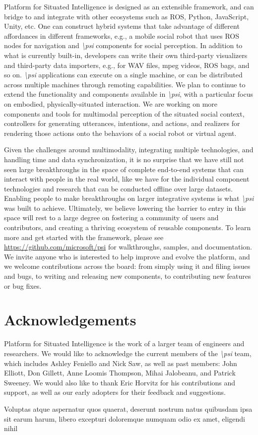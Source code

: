 \documentclass[letterpaper]{article}
\newcommand{\psif}{\emph{\textbackslash psi} }
\newcommand{\psifnospace}{\emph{\textbackslash psi}}
\begin{document}
Platform for Situated Intelligence is designed as an extensible framework, and can bridge to and integrate with other ecosystems such as ROS, Python, JavaScript, Unity, etc. One can construct hybrid systems that take advantage of different affordances in different frameworks, e.g., a mobile social robot that uses ROS nodes for navigation and \psif components for social perception. In addition to what is currently built-in, developers can write their own third-party visualizers and third-party data importers, e.g., for WAV files, mpeg videos, ROS bags, and so on. \psif applications can execute on a single machine, or can be distributed across multiple machines through remoting capabilities.  We plan to continue to extend the functionality and components available in \psifnospace, with a particular focus on embodied, physically-situated interaction. We are working on more components and tools for multimodal perception of the situated social context, controllers for generating utterances, intentions, and actions, and realizers for rendering those actions onto the behaviors of a social robot or virtual agent.

Given the challenges around multimodality, integrating multiple technologies, and handling time and data synchronization, it is no surprise that we have still not seen large breakthroughs in the space of complete end-to-end systems that can interact with people in the real world, like we have for the individual component technologies and research that can be conducted offline over large datasets. Enabling people to make breakthroughs on larger integrative systems is what \psif was built to achieve. Ultimately, we believe lowering the barrier to entry in this space will rest to a large degree on fostering a community of users and contributors, and creating a thriving ecosystem of reusable components.  To learn more and get started with the framework, please see \textcolor{blue}{\url{https://github.com/microsoft/psi}} for walkthroughs, samples, and documentation. We invite anyone who is interested to help improve and evolve the platform, and we welcome contributions across the board: from simply using it and filing issues and bugs, to writing and releasing new components, to contributing new features or bug fixes.

\vspace{-4.29mm}
\section{Acknowledgements}
Platform for Situated Intelligence is the work of a larger team of engineers and researchers. We would like to acknowledge the current members of the \psif team, which includes Ashley Feniello and Nick Saw, as well as past members: John Elliott, Don Gillett, Anne Loomis Thompson, Mihai Jalobeanu, and Patrick Sweeney. We would also like to thank Eric Horvitz for his contributions and support, as well as our early adopters for their feedback and suggestions.

  Voluptas atque aspernatur quos quaerat, deserunt nostrum natus quibusdam ipsa sit earum harum, libero excepturi doloremque numquam odio ex amet, eligendi nihil

\end{document}
